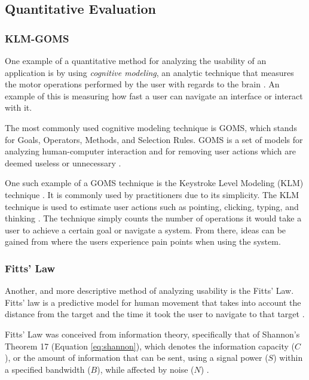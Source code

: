 	\subsection{Quantitative Evaluation}
    
    	\subsubsection{KLM-GOMS}
        	
            One example of a quantitative method for analyzing the usability of an application is by using \textit{cognitive modeling}, an analytic technique that measures the motor operations performed by the user with regards to the brain \citep{sauro2009estimating}. An example of this is measuring how fast a user can navigate an interface or interact with it. 
            
            The most commonly used cognitive modeling technique is GOMS, which stands for Goals, Operators, Methods, and Selection Rules. GOMS is a set of models for analyzing human-computer interaction and for removing user actions which are deemed useless or unnecessary \citep{card1983the}.
            
            One such example of a GOMS technique is the Keystroke Level Modeling (KLM) technique \citep{sauro2011measuring}. It is commonly used by practitioners due to its simplicity. The KLM technique is used to estimate user actions such as pointing, clicking, typing, and thinking \citep{sauro2009estimating}. The technique simply counts the number of operations it would take a user to achieve a certain goal or navigate a system. From there, ideas can be gained from where the users experience pain points when using the system. 
       
    	\subsubsection{Fitts' Law}
        
    		Another, and more descriptive method of analyzing usability is the Fitts' Law. Fitts' law is a predictive model for human movement that takes into account the distance from the target and the time it took the user to navigate to that target \citep{mackenzie1992fitts}.
            
            Fitts' Law was conceived from information theory, specifically that of Shannon's Theorem 17 (Equation \ref{eq:shannon}), which denotes the information capacity (\begin{math}C\end{math}), or the amount of information that can be sent, using a signal power (\begin{math}S\end{math}) within a specified bandwidth (\begin{math}B\end{math}), while affected by noise (\begin{math}N\end{math}) \citep{mackenzie1992fitts}.
            

